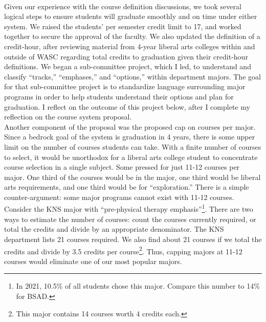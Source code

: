 \documentclass[../../../main.tex]{subfiles}
\begin{document}
\\
\vspace{0.15cm}
Given our experience with the course definition discussions, we took several logical steps to ensure students will graduate smoothly and on time under either system.  We raised the students' per semester credit limit to 17, and worked together to secure the approval of the faculty.  We also updated the definition of a credit-hour, after reviewing material from 4-year liberal arts colleges within and outside of WASC regarding total credits to graduation given their credit-hour definitions.  We began a sub-committee project, which I led, to understand and classify ``tracks,'' ``emphases,'' and ``options,'' within department majors.  The goal for that sub-committee project is to standardize language surrounding major programs in order to help students understand their options and plan for graduation.  I reflect on the outcome of this project below, after I complete my reflection on the course system proposal.
\\
\vspace{0.15cm}
Another component of the proposal was the proposed cap on courses per major.  Since a bedrock goal of the system is graduation in 4 years, there is some upper limit on the number of courses students can take.  With a finite number of courses to select, it would be unorthodox for a liberal arts college student to concentrate course selection in a single subject.  Some pressed for just 11-12 courses per major.  One third of the courses would be in the major, one third would be liberal arts requirements, and one third would be for ``exploration.''  There is a simple counter-argument: some major programs cannot exist with 11-12 courses.  Consider the KNS major with ``pre-physical therapy emphasis''\footnote{In 2021, 10.5\% of all students chose this major.  Compare this number to 14\% for BSAD.}.  There are two ways to estimate the number of courses: count the courses currently required, or total the credits and divide by an appropriate denominator.  The KNS department lists 21 courses required.  We also find about 21 courses if we total the credits and divide by 3.5 credits per course\footnote{This major contains 14 courses worth 4 credits each.}.  Thus, capping majors at 11-12 courses would eliminate one of our most popular majors.
\\
\vspace{0.15cm}
\end{document}
